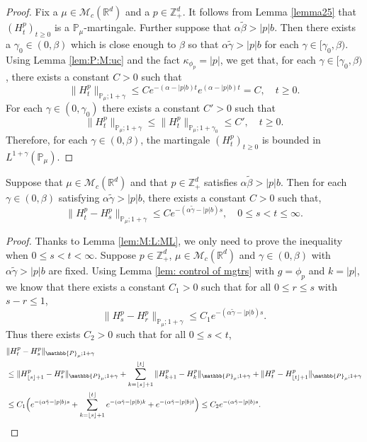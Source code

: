 \documentclass[EJP]{ejpecp} %
\begin{document}
\begin{proof}
  	Fix a $\mu \in \mathcal M_c(\mathbb R^d)$ and a $p \in \mathbb Z_+^d$.
  	It follows from Lemma \ref{lemma25} that $(H_t^p)_{t\geq 0}$ is a $\mathbb P_\mu$-martingale.
  	Further suppose that $\alpha \tilde \beta > |p| b$.
  	Then there exists a $\gamma_0 \in (0,\beta)$ which is close enough to $\beta$ so that $\alpha\tilde \gamma>|p|b$ for each $\gamma\in [\gamma_0, \beta)$.
  	Using  Lemma \ref{lem:P:M:uc} and the fact $\kappa_{\phi_p}=|p|$, we get that, for each $\gamma\in [\gamma_0, \beta)$, there exists a constant $C>0$ such that
\[
    \|H_t^p\|_{\mathbb P_\mu;1+\gamma}
    \leq C e^{-(\alpha-|p|b)t}e^{(\alpha-|p|b)t}
    = C,
    \quad t\geq 0.
\]
	For each $\gamma\in (0, \gamma_0)$ there exists a constant $C'>0$ such that
\[
    \| H_t^p \|_{\mathbb P_\mu;1+\gamma}
    \leq \| H_t^p \|_{\mathbb P_\mu;1+\gamma_0}
    \leq C',
    \quad t\geq 0.
\]
	Therefore, for each $\gamma \in (0,\beta)$, the martingale $(H_t^p)_{t\geq 0}$ is bounded in $L^{1+\gamma}(\mathbb{P}_{\mu})$.
\end{proof}

\begin{lemma}
\label{lem: control of wt}
	Suppose that $\mu\in \mathcal M_c(\mathbb R^d)$ and that $p \in \mathbb Z_+^d$ satisfies $\alpha \tilde \beta > |p|b$.
	Then for each $\gamma \in (0,\beta)$ satisfying $\alpha \tilde \gamma > |p|b$, there exists a constant $C> 0$ such that,
\[
    \|H^p_t-H^p_s\|_{\mathbb{P}_{\mu};1+\gamma}
    \leq C e^{-(\alpha \tilde \gamma-|p|b)s},
    \quad 0 \leq s < t \leq \infty.
\]
\end{lemma}

\begin{proof}
	Thanks to Lemma \ref{lem:M:L:ML}, we only  need to prove the inequality  when $0\leq s < t<\infty$.
	Suppose $p\in \mathbb{Z}_+^d$, $\mu\in \mathcal M_c(\mathbb R^d)$ and  $\gamma \in (0,\beta)$ with $\alpha \tilde \gamma > |p|b$ are fixed.
	Using Lemma \ref{lem: control of mgtrs} with $g=\phi_p$ and $k=|p|$,  we know that there exists a constant $C_1>0$ such that for all $0\leq r\leq s $ with $s-r\leq1$,
\[
    \|H^p_s-H^p_r\|_{\mathbb P_\mu; 1+\gamma}
    \leq  C_1 e^{-(\alpha\tilde \gamma-|p|b)s}.
\]
	Thus there exists $C_2>0$ such that for all $0\leq s<t$,
\begin{align}
    & \|H^p_t-H^p_s\|_{\mathbb{P}_{\mu};1+\gamma} \\
    & \leq \|H^p_{\lfloor s \rfloor+1}-H^p_s\|_{\mathbb{P}_{\mu};1+\gamma}+\sum_{k=\lfloor s \rfloor+1}^{\lfloor t \rfloor}\|H^p_{k+1}-H^p_{k}\|_{\mathbb{P}_{\mu};1+\gamma}+\|H^p_t-H^p_{\lfloor t \rfloor+1}\|_{\mathbb{P}_{\mu};1+\gamma} \\
    & \leq C_1 \Big(e^{-(\alpha \tilde \gamma- |p|b) s}+\sum_{k=\lfloor s \rfloor+1}^{\lfloor t \rfloor} e^{-(\alpha \tilde \gamma- |p|b) k} + e^{-(\alpha \tilde \gamma-|p|b) t}\Big)
    \leq C_2e^{-(\alpha \tilde \gamma-|p|b)s}.
   	\qedhere
\end{align}	
\end{proof}
\end{document}
